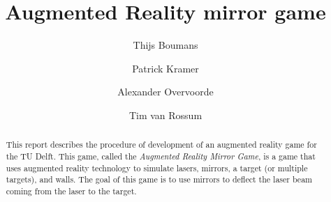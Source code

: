 \documentclass[]{report}
\title{Augmented Reality mirror game}
\author{Thijs Boumans \and Patrick Kramer \and
        Alexander Overvoorde \and Tim van Rossum}
\begin{document}
\maketitle

\begin{abstract}
This report describes the procedure of development of an augmented reality game
for the TU Delft. This game, called the \emph{Augmented Reality Mirror Game},
is a game that uses augmented reality technology to simulate lasers, mirrors,
a target (or multiple targets), and walls. The goal of this game is to use
mirrors to deflect the laser beam coming from the laser to the target.
\end{abstract}
\tableofcontents



\end{document}
